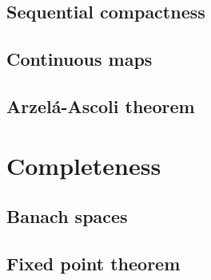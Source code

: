 \documentclass[../Year2.tex]{subfiles}
\begin{document}
\subsection{Sequential compactness}

\subsection{Continuous maps}

\subsection{Arzelá-Ascoli theorem}

\section{Completeness}

\subsection{Banach spaces}

\subsection{Fixed point theorem}
\end{document}
